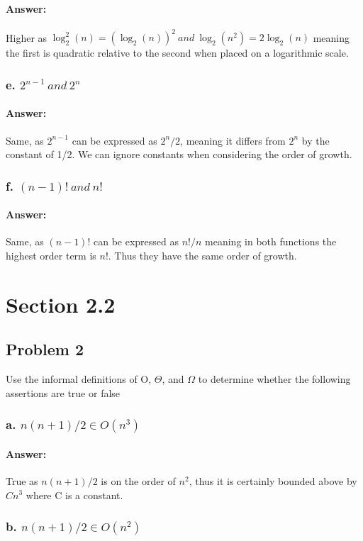 \documentclass{article}
\begin{document}
      \paragraph{Answer:}
        Higher as $\log_{2}^2(n) = (\log_{2}(n))^2 \ and \ \log_{2}(n^2) = 2\log_{2}(n)$ meaning the first is quadratic relative to the second when placed on a logarithmic scale.
    \subsubsection{e. $2^{n-1} \ and \ 2^n$}
      \paragraph{Answer:}
        Same, as $2^{n-1}$ can be expressed as $2^n/2$, meaning it differs from $2^n$ by the constant of 1/2. We can ignore constants when considering the order of growth.
    \subsubsection{f. $(n-1)! \ and \ n!$}
      \paragraph{Answer:}
        Same, as $(n-1)!$ can be expressed as $n!/n$ meaning in both functions the highest order term is $n!$. Thus they have the same order of growth.
\section{Section 2.2}
  \subsection{Problem 2}
  Use the informal definitions of O, $\Theta$, and $\Omega$ to determine whether the following assertions are true or false
  \subsubsection{a. $n(n + 1)/2 \in O(n^3 )$}
    \paragraph{Answer:}
      True as $n(n+1)/2$ is on the order of $n^2$, thus it is certainly bounded above by $Cn^3$ where C is a constant.
  \subsubsection{b. $n(n + 1)/2 \in O(n^2 )$}
\end{document}
